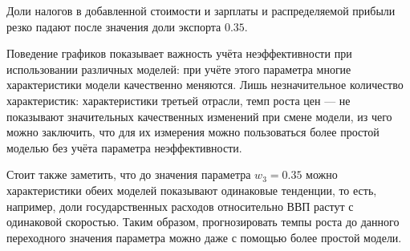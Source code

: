 \documentclass[10pt, a4paper]{article}
\begin{document}
Доли налогов в добавленной стоимости и зарплаты и распределяемой прибыли резко падают после значения доли экспорта $0.35$.

Поведение графиков показывает важность учёта неэффективности при использовании различных моделей: при учёте этого параметра многие характеристики модели качественно меняются. Лишь незначительное количество характеристик: характеристики третьей отрасли, темп роста цен --- не показывают значительных качественных изменений при смене модели, из чего можно заключить, что для их измерения можно пользоваться более простой моделью без учёта параметра неэффективности.

Стоит также заметить, что до значения параметра $w_3=0.35$ можно характеристики обеих моделей показывают одинаковые тенденции, то есть, например, доли государственных расходов относительно ВВП растут с одинаковой скоростью. Таким образом, прогнозировать темпы роста до данного переходного значения параметра можно даже с помощью более простой модели.
\end{document}
